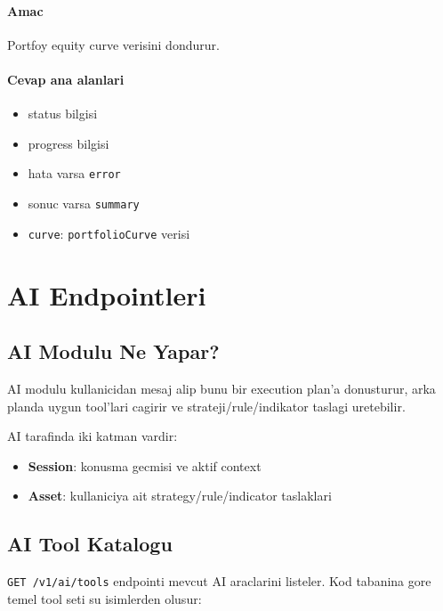 \documentclass[11pt,a4paper]{article}
\begin{document}
\paragraph{Amac}
Portfoy equity curve verisini dondurur.

\paragraph{Cevap ana alanlari}
\begin{itemize}[leftmargin=1.5em]
    \item status bilgisi
    \item progress bilgisi
    \item hata varsa \texttt{error}
    \item sonuc varsa \texttt{summary}
    \item \texttt{curve}: \texttt{portfolioCurve} verisi
\end{itemize}

\section{AI Endpointleri}

\subsection{AI Modulu Ne Yapar?}

AI modulu kullanicidan mesaj alip bunu bir execution plan'a donusturur, arka planda uygun tool'lari cagirir ve strateji/rule/indikator taslagi uretebilir.

AI tarafinda iki katman vardir:

\begin{itemize}[leftmargin=1.5em]
    \item \textbf{Session}: konusma gecmisi ve aktif context
    \item \textbf{Asset}: kullaniciya ait strategy/rule/indicator taslaklari
\end{itemize}

\subsection{AI Tool Katalogu}

\texttt{GET /v1/ai/tools} endpointi mevcut AI araclarini listeler. Kod tabanina gore temel tool seti su isimlerden olusur:
\end{document}
